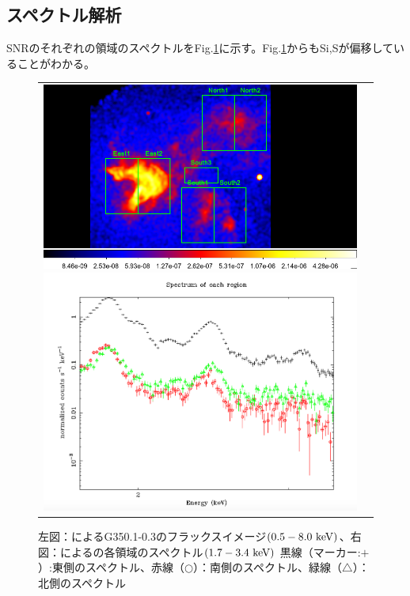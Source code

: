 \documentclass[a4j]{jarticle}%
\begin{document}
\subsection{スペクトル解析}
SNRのそれぞれの領域のスペクトルをFig.\ref{fig:spec_reg}に示す。Fig.\ref{fig:spec_reg}からも\textrm{Si,S}が偏移していることがわかる。
\begin{figure}[H]
\begin{center}
\begin{tabular}{cc}

\begin{minipage}{0.5\hsize}
\begin{center}
\includegraphics[scale=0.35]{./paper_region.png}
\end{center}
\end{minipage}

\begin{minipage}{0.5\hsize}
\begin{center}
\includegraphics[scale=0.3]{./spectrum_xspec.png}
\end{center}
\end{minipage}
\end{tabular}
\caption{左図：によるG350.1-0.3のフラックスイメージ$\rm{(0.5-8.0~keV)}$、右図：によるの各領域のスペクトル$\rm{(1.7-3.4~keV)}$ 黒線（マーカー:$+$）:東側のスペクトル、赤線（$\bigcirc$）：南側のスペクトル、緑線（$\bigtriangleup$）：北側のスペクトル}
\label{fig:spec_reg}
\end{center}
\end{figure}
\end{document}
